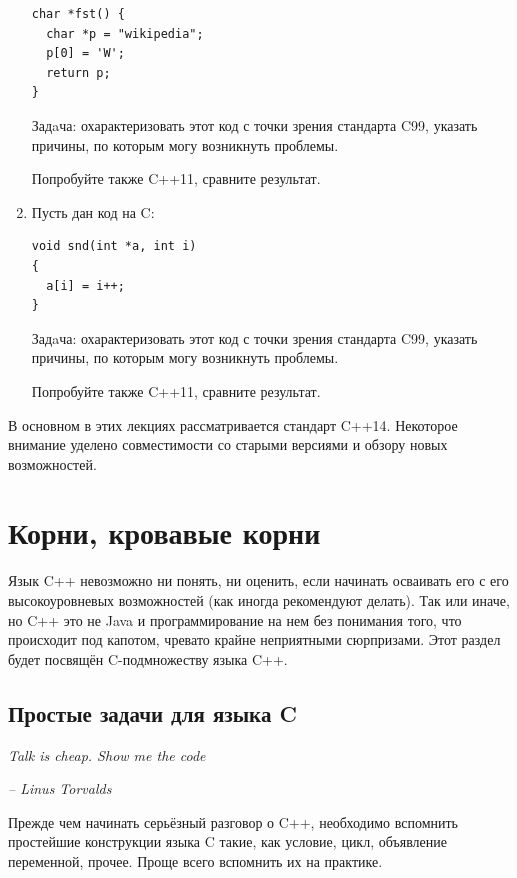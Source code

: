 \documentclass[a4paper,12pt,oneside]{book}
\begin{document}
\begin{enumerate}
\begin{lstlisting}
char *fst() {
  char *p = "wikipedia";
  p[0] = 'W';
  return p;
}
\end{lstlisting}

Задaча: охарактеризовать этот код с точки зрения стандарта C99, указать причины, по которым могу возникнуть проблемы.

Попробуйте также C++11, сравните результат.

\item
Пусть дан код на C:

\begin{lstlisting}
void snd(int *a, int i)
{
  a[i] = i++;
}
\end{lstlisting}

Задaча: охарактеризовать этот код с точки зрения стандарта C99, указать причины, по которым могу возникнуть проблемы.

Попробуйте также C++11, сравните результат.

\end{enumerate}

В основном в этих лекциях рассматривается стандарт C++14. Некоторое внимание уделено совместимости со старыми версиями и обзору новых возможностей.

\pagebreak
\chapter{Корни, кровавые корни}\label{chap:roots}

Язык C++ невозможно ни понять, ни оценить, если начинать осваивать его с его высокоуровневых возможностей (как иногда рекомендуют делать). Так или иначе, но C++ это не Java и программирование на нем без понимания того, что происходит под капотом, чревато крайне неприятными сюрпризами. Этот раздел будет посвящён C-подмножеству языка C++.

\section{Простые задачи для языка C}\label{PrimeTasks}

\hfill\textit{Talk is cheap. Show me the code}{\vspace{0.5em}}

\hfill\textit{-- Linus Torvalds}

Прежде чем начинать серьёзный разговор о C++, необходимо вспомнить простейшие конструкции языка C такие, как условие, цикл, объявление переменной, прочее. Проще всего вспомнить их на практике.
\end{document}
